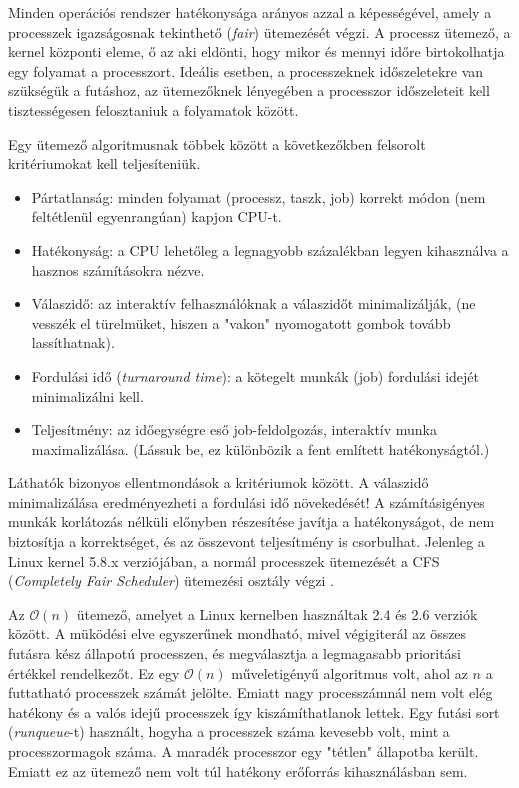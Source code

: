 

Minden operációs rendszer hatékonysága arányos azzal a képességével, amely a processzek igazságosnak tekinthető (\textit{fair}) ütemezését végzi. A processz ütemező, a kernel központi eleme, ő az aki eldönti, hogy mikor és mennyi időre birtokolhatja egy folyamat a processzort. Ideális esetben, a processzeknek időszeletekre van szükségük a futáshoz, az ütemezőknek lényegében a processzor időszeleteit kell tisztességesen felosztaniuk a folyamatok között.

Egy ütemező algoritmusnak többek között a következőkben felsorolt kritériumokat kell teljesíteniük.
\begin{itemize}
	\item Pártatlanság: minden folyamat (processz, taszk, job) korrekt módon (nem feltétlenül egyenrangúan) kapjon CPU-t.
	\item Hatékonyság: a CPU lehetőleg a legnagyobb százalékban legyen kihasználva a hasznos számításokra nézve.
	\item Válaszidő: az interaktív felhasználóknak a válaszidőt minimalizálják, (ne vesszék el türelmüket, hiszen a "vakon" nyomogatott gombok tovább lassíthatnak).
	\item Fordulási idő (\textit{turnaround time}): a kötegelt munkák (job) fordulási idejét minimalizálni
kell.
	\item Teljesítmény: az időegységre eső job-feldolgozás, interaktív munka maximalizálása.
(Lássuk be, ez különbözik a fent említett hatékonyságtól.)
\end{itemize}
Láthatók bizonyos ellentmondások a kritériumok között. A válaszidő minimalizálása eredményezheti a fordulási idő növekedését!
A számításigényes munkák korlátozás nélküli
előnyben részesítése javítja a hatékonyságot, de nem biztosítja a korrektséget, és az összevont
teljesítmény is csorbulhat.
Jelenleg a Linux kernel 5.8.x verziójában, a normál processzek ütemezését a CFS (\textit{Completely Fair Scheduler}) ütemezési osztály végzi \cite{wong2008towards}.



Az $\mathcal{O}(n)$ ütemező, amelyet a Linux kernelben használtak 2.4 és 2.6 verziók között. A müködési elve egyszerűnek mondható, mivel végigiterál az összes futásra kész állapotú processzen, és megválasztja a legmagasabb prioritási értékkel rendelkezőt.
Ez egy $\mathcal{O}(n)$ műveletigényű algoritmus volt, ahol az $n$ a futtatható processzek számát jelölte. Emiatt nagy processzámnál nem volt elég hatékony és a valós idejű processzek így kiszámíthatlanok lettek.
Egy futási sort (\textit{runqueue}-t) használt, hogyha a processzek száma kevesebb volt, mint a processzormagok száma. A maradék processzor egy "tétlen" állapotba került. Emiatt ez az ütemező nem volt túl hatékony erőforrás kihasználásban sem.

